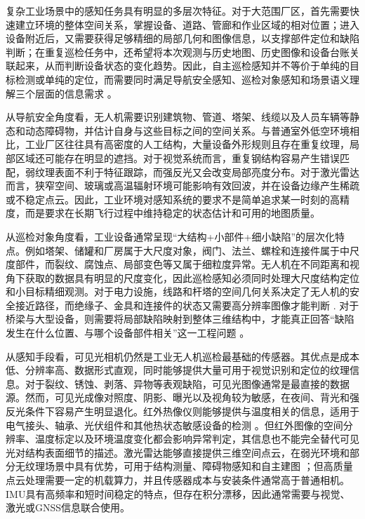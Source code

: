 复杂工业场景中的感知任务具有明显的多层次特征。对于大范围厂区，首先需要快速建立环境的整体空间关系，掌握设备、道路、管廊和作业区域的相对位置；进入设备附近后，又需要获得足够精细的局部几何和图像信息，以支撑部件定位和缺陷判断；在重复巡检任务中，还希望将本次观测与历史地图、历史图像和设备台账关联起来，从而判断设备状态的变化趋势。因此，自主巡检感知并不等价于单纯的目标检测或单纯的定位，而需要同时满足导航安全感知、巡检对象感知和场景语义理解三个层面的信息需求
\cite{kanellakis2017survey,nex2014uav,yeum2015vision,tao2019digital}。

从导航安全角度看，无人机需要识别建筑物、管道、塔架、线缆以及人员车辆等静态和动态障碍物，并估计自身与这些目标之间的空间关系。与普通室外低空环境相比，工业厂区往往具有高密度的人工结构，大量设备外形规则且存在重复纹理，局部区域还可能存在明显的遮挡。对于视觉系统而言，重复钢结构容易产生错误匹配，弱纹理表面不利于特征跟踪，而强反光又会改变局部亮度分布。对于激光雷达而言，狭窄空间、玻璃或高温辐射环境可能影响有效回波，并在设备边缘产生稀疏或不稳定点云。因此，工业环境对感知系统的要求不是简单追求某一时刻的高精度，而是要求在长期飞行过程中维持稳定的状态估计和可用的地图质量。

从巡检对象角度看，工业设备通常呈现“大结构+小部件+细小缺陷”的层次化特点。例如塔架、储罐和厂房属于大尺度对象，阀门、法兰、螺栓和连接件属于中尺度部件，而裂纹、腐蚀点、局部变色等又属于细粒度异常。无人机在不同距离和视角下获取的数据具有明显的尺度变化，因此巡检感知必须同时处理大尺度结构定位和小目标精细观测。对于电力设施，线路和杆塔的空间几何关系决定了无人机的安全接近路径，而绝缘子、金具和连接件的状态又需要高分辨率图像才能判断
\cite{deng2014unmanned,miao2020uav,vieira2023insplad}. 对于桥梁与大型设备，则需要将局部缺陷映射到整体三维结构中，才能真正回答“缺陷发生在什么位置、与哪个设备部件相关”这一工程问题
\cite{liu2020image,li2022bridge,jiang2022vision}。

从感知手段看，可见光相机仍然是工业无人机巡检最基础的传感器。其优点是成本低、分辨率高、数据形式直观，同时能够提供大量可用于视觉识别和定位的纹理信息。对于裂纹、锈蚀、剥落、异物等表观缺陷，可见光图像通常是最直接的数据源。然而，可见光成像对照度、阴影、曝光以及视角较为敏感，在夜间、背光和强反光条件下容易产生明显退化。红外热像仪则能够提供与温度相关的信息，适用于电气接头、轴承、光伏组件和其他热状态敏感设备的检测
\cite{jadin2012recent,usamentiaga2014infrared}。但红外图像的空间分辨率、温度标定以及环境温度变化都会影响异常判定，其信息也不能完全替代可见光对结构表面细节的描述。激光雷达能够直接提供三维空间点云，在弱光环境和部分无纹理场景中具有优势，可用于结构测量、障碍物感知和自主建图
\cite{zhang2014loam,wujq2021review}；但高质量点云处理需要一定的机载算力，并且传感器成本与安装条件通常高于普通相机。IMU具有高频率和短时间稳定的特点，但存在积分漂移，因此通常需要与视觉、激光或GNSS信息联合使用。

